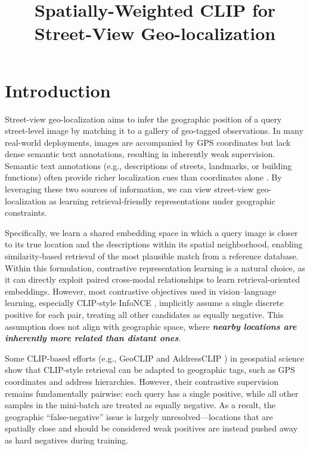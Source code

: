 \documentclass{isprs}
\begin{document}
\title{Spatially-Weighted CLIP for Street-View Geo-localization}


\maketitle

\sloppy

\section{Introduction}

Street-view geo-localization \cite{yan2024georeasoner,ye2025cross} aims to infer the geographic position of a query street-level image by matching it to a gallery of geo-tagged observations. In many real-world deployments, images are accompanied by GPS coordinates \cite{xu2024addressclip} but lack dense semantic text annotations, resulting in inherently weak supervision. Semantic text annotations (e.g., descriptions of streets, landmarks, or building functions) often provide richer localization cues than coordinates alone \cite{han2025towards}. By leveraging these two sources of information, we can view street-view geo-localization as learning retrieval-friendly representations under geographic constraints.

Specifically, we learn a shared embedding space in which a query image is closer to its true location and the descriptions within its spatial neighborhood, enabling similarity-based retrieval of the most plausible match from a reference database. Within this formulation, contrastive representation learning \cite{chen2020simple} is a natural choice, as it can directly exploit paired cross-modal relationships to learn retrieval-oriented embeddings. However, most contrastive objectives used in vision–language learning, especially CLIP-style InfoNCE \cite{radford2021learning,li2022blip}, implicitly assume a single discrete positive for each pair, treating all other candidates as equally negative. This assumption does not align with geographic space, where \textbf{\textit{nearby locations are inherently more related than distant ones}}.

Some CLIP-based efforts (e.g., GeoCLIP \cite{vivanco2023geoclip} and AddressCLIP \cite{xu2024addressclip}) in geospatial science show that CLIP-style retrieval can be adapted to geographic tags, such as GPS coordinates and address hierarchies. However, their contrastive supervision remains fundamentally pairwise: each query has a single positive, while all other samples in the mini-batch are treated as equally negative. As a result, the geographic “false-negative” issue is largely unresolved—locations that are spatially close and should be considered weak positives are instead pushed away as hard negatives during training. 
\end{document}
